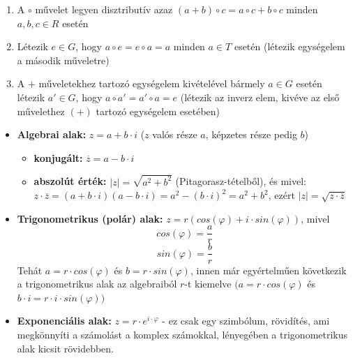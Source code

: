 \documentclass[12pt,a4paper]{article}
\begin{document}
\begin{tcolorbox}[colback=green!5!white,colframe=green!60!black,title= 3. Csoport{,} gyűrű{,} test]
\begin{enumerate}
            \item A \(\circ\) művelet legyen disztributív azaz \((a + b) \circ c = a \circ c + b \circ c\) minden \(a, b, c \in R\) esetén
            \item Létezik \(e \in G\), hogy \(a \circ e = e \circ a = a\) minden \(a \in T\) esetén (létezik egységelem a második műveletre)
            \item A \(+\) műveletekhez tartozó egységelem kivételével bármely \(a \in G\) esetén létezik \(a' \in G\), hogy \(a \circ a' = a' \circ a = e\) (létezik az inverz elem, kivéve az első művelethez \((+)\) tartozó egységelem
            esetében)
        \end{enumerate}
\end{tcolorbox}

\begin{tcolorbox}[colback=green!5!white,colframe=green!60!black,title= 4. Komplex számok algebrai{,} trigonometrikus{,} exponenciális alakja]
    \begin{itemize}
        \item \textbf{Algebrai alak:} \(z = a + b\cdot i\) (\(z\) valós része \(a\), képzetes része pedig \(b\))
        \begin{itemize}
            \item \textbf{konjugált:} \(\overline{z} = a - b\cdot i\)
            \item \textbf{abszolút érték:} \(\left\lvert z \right\rvert  = \sqrt{a^2+b^2}\) (Pitagorasz-tételből), és mivel: \\ \(z \cdot \overline{z} = (a + b\cdot i)(a - b\cdot i) = a^2 -(b\cdot i)^2=a^2+b^2\), ezért \( \left\lvert z\right\rvert =\sqrt{z \cdot \overline{z} }  \)
        \end{itemize}
        \item \textbf{Trigonometrikus (polár) alak:} \(z = r(cos(\varphi ) + i \cdot sin(\varphi))\), mivel
        $$ cos(\varphi)=\frac{a}{r} $$
        $$ sin(\varphi)=\frac{b}{r} $$
        Tehát \(a = r\cdot cos(\varphi)\) és \(b = r\cdot sin(\varphi)\), innen már egyértelműen következik a trigonometrikus alak az algebraiból \(r\)-t kiemelve \((a = r\cdot cos(\varphi)\) és \(b\cdot i = r \cdot i\cdot sin(\varphi))\)
        \item \textbf{Exponenciális alak:} \(z = r \cdot e^{i\cdot \varphi}\) - ez csak egy szimbólum, rövidítés, ami megkönnyíti a
        számolást a komplex számokkal, lényegében a trigonometrikus alak kicsit rövidebben.
    \end{itemize}
\end{tcolorbox}
\end{document}
